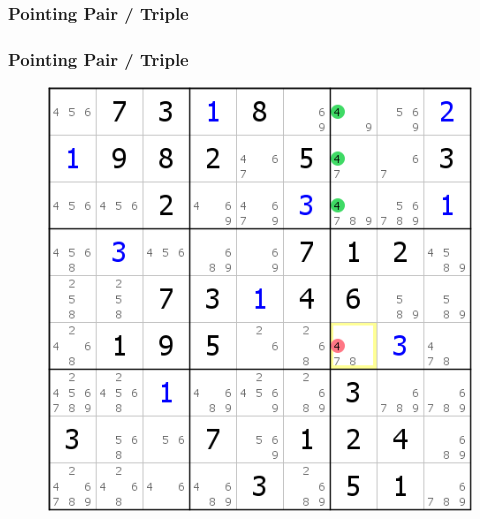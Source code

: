 \documentclass[accentcolor=tud6b,colorbacktitle,inverttitle,landscape,german,presentation,t]{tudbeamer}
\begin{document}
		\subsubsection{Pointing Pair / Triple}
			\begin{frame}
			\frametitle{Pointing Pair / Triple}
			\begin{figure}[Hh]
    			\includegraphics[width=\textwidth,height=\textheight-10pt,keepaspectratio]{./img/pointing_triple.png}
			\end{figure}
			\end{frame}
\end{document}

